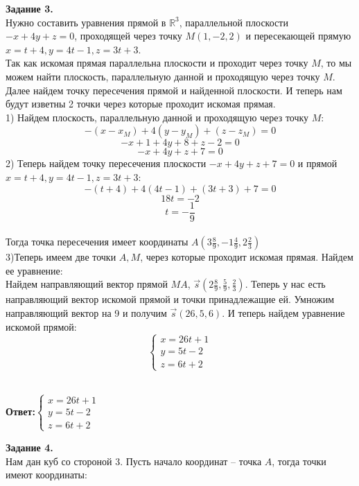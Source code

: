 \documentclass[12pt,a4paper]{scrartcl}
\begin{document}
	\noindent
	\textbf{Задание 3.} \\	
	 Нужно составить уравнения прямой в $\mathbb{R}^3$, параллельной плоскости $-x + 4y + z = 0$, проходящей через точку $M(1, -2, 2)$ и
	 пересекающей прямую $x = t + 4, y = 4t - 1, z = 3t + 3$. \\
	 Так как искомая прямая параллельна плоскости и проходит через точку $M$, то мы можем найти плоскость, параллельную данной и проходящую через точку $M$. Далее найдем точку пересечения прямой и найденной плоскости. И теперь нам будут изветны 2 точки через которые проходит искомая прямая.\\
	 1) Найдем плоскость, параллельную данной и проходящую через точку $M$:\\
		$$-(x - x_M) + 4(y - y_M) + (z - z_M) = 0$$
		$$-x + 1 + 4y + 8 + z - 2 = 0$$
		$$-x + 4y + z + 7 = 0$$
	2) Теперь найдем точку пересечения плоскости $-x + 4y + z + 7 = 0$ и прямой $x = t + 4, y = 4t - 1, z = 3t + 3$:\\
	$$-(t + 4) + 4(4t - 1) + (3t + 3) + 7 = 0$$
	$$18t = -2$$
	$$t = -\frac{1}{9}$$\\
	Тогда точка пересечения имеет координаты $A(3\frac{8}{9}, -1\frac{4}{9}, 2\frac{2}{3})$\\
	3)Теперь имеем две точки $A, M$, через которые проходит искомая прямая. Найдем ее уравнение:\\
	Найдем направляющий вектор прямой $MA$, $\overrightarrow{s}(2\frac{8}{9}, \frac{5}{9}, \frac{2}{3})$. Теперь у нас есть направляющий вектор искомой прямой и точки принадлежащие ей. Умножим направляющий вектор на 9 и получим $\overrightarrow{s}(26, 5, 6)$. И теперь найдем уравнение искомой прямой:\\
	$$\begin{cases}
		x = 26t + 1 \\
		 y = 5t - 2\\
		 z = 6t + 2
	\end{cases}$$\\
	\begin{flushright}	
		\textbf{Ответ:$\begin{cases}
			x = 26t + 1 \\
			y = 5t - 2\\
			z = 6t + 2
			\end{cases}$} 
	\end{flushright}
	\noindent
	\textbf{Задание 4.} \\
	Нам дан куб со стороной 3. Пусть начало координат -- точка $A$, тогда точки имеют координаты:\\
\end{document}
